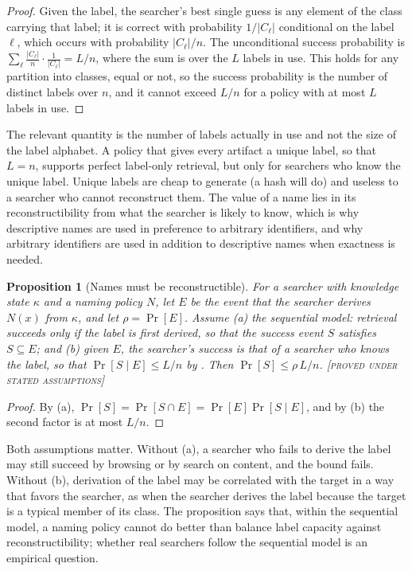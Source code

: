 \documentclass[11pt,twoside,openright]{book}
\theoremstyle{plain}
\newtheorem{proposition}[theorem]{Proposition}
\theoremstyle{definition}
\theoremstyle{remark}
\newcommand{\Proved}{\textup{\textsc{[proved under stated assumptions]}}}
\begin{document}
\begin{proof}
Given the label, the searcher's best single guess is any element of the class carrying that label; it is correct with probability $1/|C_\ell|$ conditional on the label $\ell$, which occurs with probability $|C_\ell|/n$. The unconditional success probability is $\sum_\ell \frac{|C_\ell|}{n}\cdot\frac{1}{|C_\ell|}=L/n$, where the sum is over the $L$ labels in use. This holds for any partition into classes, equal or not, so the success probability is the number of distinct labels over $n$, and it cannot exceed $L/n$ for a policy with at most $L$ labels in use.
\end{proof}

The relevant quantity is the number of labels actually in use and not the size of the label alphabet. A policy that gives every artifact a unique label, so that $L=n$, supports perfect label-only retrieval, but only for searchers who know the unique label. Unique labels are cheap to generate (a hash will do) and useless to a searcher who cannot reconstruct them. The value of a name lies in its reconstructibility from what the searcher is likely to know, which is why descriptive names are used in preference to arbitrary identifiers, and why arbitrary identifiers are used in addition to descriptive names when exactness is needed.

\begin{proposition}[Names must be reconstructible]\label{cor:reconstruct}
For a searcher with knowledge state $\kappa$ and a naming policy $N$, let $E$ be the event that the searcher derives $N(x)$ from $\kappa$, and let $\rho=\Pr[E]$. Assume (a) the sequential model: retrieval succeeds only if the label is first derived, so that the success event $S$ satisfies $S\subseteq E$; and (b) given $E$, the searcher's success is that of a searcher who knows the label, so that $\Pr[S\mid E]\le L/n$ by . Then $\Pr[S]\le\rho\,L/n$.
\Proved{}
\end{proposition}

\begin{proof}
By (a), $\Pr[S]=\Pr[S\cap E]=\Pr[E]\Pr[S\mid E]$, and by (b) the second factor is at most $L/n$.
\end{proof}

Both assumptions matter. Without (a), a searcher who fails to derive the label may still succeed by browsing or by search on content, and the bound fails. Without (b), derivation of the label may be correlated with the target in a way that favors the searcher, as when the searcher derives the label because the target is a typical member of its class. The proposition says that, within the sequential model, a naming policy cannot do better than balance label capacity against reconstructibility; whether real searchers follow the sequential model is an empirical question.
\end{document}
